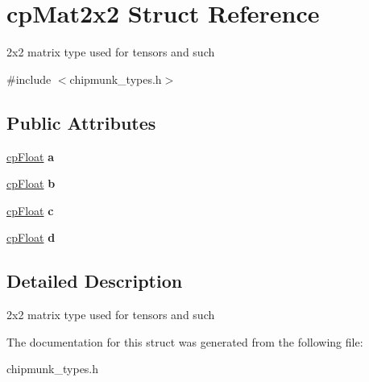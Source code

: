 \hypertarget{structcp_mat2x2}{}\section{cp\+Mat2x2 Struct Reference}
\label{structcp_mat2x2}


2x2 matrix type used for tensors and such  




{\ttfamily \#include $<$chipmunk\+\_\+types.\+h$>$}

\subsection*{Public Attributes}
\begin{DoxyCompactItemize}
\item 
\hypertarget{structcp_mat2x2_a3f392cee2281ef681ea192e22dae75fa}{}\hyperlink{group__basic_types_gac1ed65573e035bf892505768c852d8d3}{cp\+Float} {\bfseries a}\label{structcp_mat2x2_a3f392cee2281ef681ea192e22dae75fa}

\item 
\hypertarget{structcp_mat2x2_a633387544257634501d1b8d3d3b7cb01}{}\hyperlink{group__basic_types_gac1ed65573e035bf892505768c852d8d3}{cp\+Float} {\bfseries b}\label{structcp_mat2x2_a633387544257634501d1b8d3d3b7cb01}

\item 
\hypertarget{structcp_mat2x2_aa64133ad4fce658b0ccd4626ca021b45}{}\hyperlink{group__basic_types_gac1ed65573e035bf892505768c852d8d3}{cp\+Float} {\bfseries c}\label{structcp_mat2x2_aa64133ad4fce658b0ccd4626ca021b45}

\item 
\hypertarget{structcp_mat2x2_a326abf4082ad424f8911f54c42a0e85c}{}\hyperlink{group__basic_types_gac1ed65573e035bf892505768c852d8d3}{cp\+Float} {\bfseries d}\label{structcp_mat2x2_a326abf4082ad424f8911f54c42a0e85c}

\end{DoxyCompactItemize}


\subsection{Detailed Description}
2x2 matrix type used for tensors and such 

The documentation for this struct was generated from the following file\+:\begin{DoxyCompactItemize}
\item 
chipmunk\+\_\+types.\+h\end{DoxyCompactItemize}
